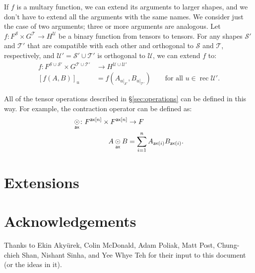 \documentclass{article}
\DeclareMathOperator{\rec}{rec}
\newcommand{\restrict}[2]{\left.#1\right|_{#2}}
\begin{document}
If $f$ is a multary function, we can extend its arguments to larger shapes, and we don't have to extend all the arguments with the same names. We consider just the case of two arguments; three or more arguments are analogous. Let $f \colon F^{\mathcal{S}} \times G^{\mathcal{T}} \rightarrow H^{\mathcal{U}}$ be a binary function from tensors to tensors. For any shapes $\mathcal{S'}$ and $\mathcal{T'}$ that are compatible with each other and orthogonal to $\mathcal{S}$ and $\mathcal{T}$, respectively, and $\mathcal{U'} = \mathcal{S'} \cup \mathcal{T'}$ is orthogonal to $\mathcal{U}$, we can extend $f$ to:
\begin{align*}
f \colon F^{\mathcal{S} \cup \mathcal{S'}} \times G^{\mathcal{T} \cup \mathcal{T'}} &\rightarrow H^{\mathcal{U} \cup \mathcal{U'}} \\
  [f(A,B)]_u &= f\left(A_{\restrict{u}{\mathcal{S'}}},B_{\restrict{u}{\mathcal{T'}}}\right) \qquad \text{for all $u \in \rec\mathcal{U'}$.}
\end{align*}

All of the tensor operations described in \S\ref{sec:operations} can be defined in this way. For example, the contraction operator can be defined as:
\begin{align*}
  \mathbin{\underset{\mathsf{ax}}{\odot}} \colon F^{\mathsf{ax}[n]} \times F^{\mathsf{ax}[n]} &\rightarrow F \\
  A \mathbin{\underset{\mathsf{ax}}{\odot}} B &= \sum_{i=1}^n A_{\mathsf{ax}(i)} B_{\mathsf{ax}(i)}.
\end{align*}

\section{Extensions}





\section*{Acknowledgements}

Thanks to Ekin Aky\"{u}rek, Colin McDonald, Adam Poliak, Matt Post, Chung-chieh Shan, Nishant Sinha, and Yee Whye Teh for their input to this document (or the ideas in it).

\iffalse %
\section*{References}
\fi



\end{document}
